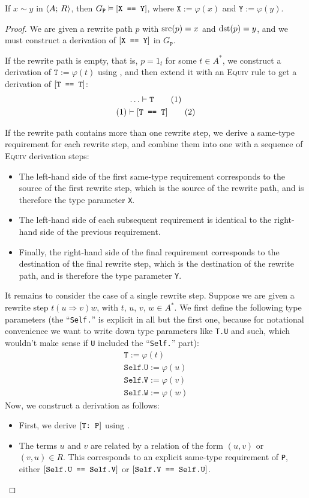 \documentclass[../generics]{subfiles}
\begin{document}
\begin{theorem}\label{path to derivation}
If $x\sim y$ in $\langle A;\,R\rangle$, then $G_\texttt{P}\vDash[\texttt{X == Y}]$, where $\texttt{X}:=\varphi(x)$ and $\texttt{Y}:=\varphi(y)$.
\end{theorem}
\begin{proof}
We are given a rewrite path $p$ with $\operatorname{src}(p)=x$ and $\operatorname{dst}(p)=y$, and we must construct a derivation of $[\texttt{X == Y}]$ in $G_\texttt{P}$.

If the rewrite path is empty, that is, $p=1_t$ for some $t\in A^*$, we construct a derivation of $\texttt{T}:=\varphi(t)$ using , and then extend it with an \textsc{Equiv} rule to get a derivation of $[\texttt{T == T}]$:
\begin{gather*}
\ldots\vdash\texttt{T}\tag{1}\\
(1)\vdash[\texttt{T == T}]\tag{2}
\end{gather*}

If the rewrite path contains more than one rewrite step, we derive a same-type requirement for each rewrite step, and combine them into one with a sequence of \textsc{Equiv} derivation steps:
\begin{itemize}
\item The left-hand side of the first same-type requirement corresponds to the source of the first rewrite step, which is the source of the rewrite path, and is therefore the type parameter \texttt{X}.
\item The left-hand side of each subsequent requirement is identical to the right-hand side of the previous requirement.
\item Finally, the right-hand side of the final requirement corresponds to the destination of the final rewrite step, which is the destination of the rewrite path, and is therefore the type parameter \texttt{Y}.
\end{itemize}

It remains to consider the case of a single rewrite step. Suppose we are given a rewrite step $t(u\Rightarrow v)w$, with $t$, $u$, $v$, $w\in A^*$. We first define the following type parameters (the ``\texttt{Self.}'' is explicit in all but the first one, because for notational convenience we want to write down type parameters like \texttt{T.U} and such, which wouldn't make sense if \texttt{U} included the ``\texttt{Self.}'' part):
\begin{gather*}
\texttt{T} := \varphi(t)\\
\texttt{Self.U} := \varphi(u)\\
\texttt{Self.V} := \varphi(v)\\
\texttt{Self.W} := \varphi(w)
\end{gather*}
Now, we construct a derivation as follows:
\begin{itemize}
\item First, we derive $[\texttt{T:~P}]$ using .
\item The terms $u$ and $v$ are related by a relation of the form $(u,v)$ or $(v,u)\in R$. This corresponds to an explicit same-type requirement of \texttt{P}, either $[\texttt{Self.U == Self.V}]$ or $[\texttt{Self.V == Self.U}]$.


\end{itemize}
\end{proof}
\end{document}
